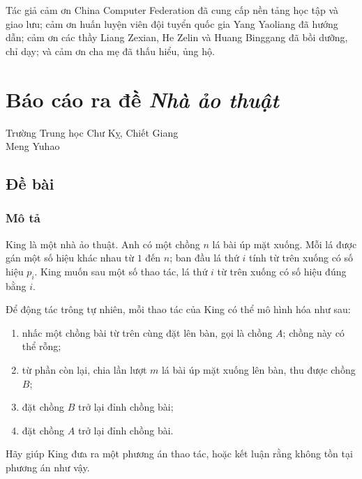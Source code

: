 \documentclass[11pt]{article}
\begin{document}
Tác giả cảm ơn China Computer Federation đã cung cấp nền tảng học tập và giao
lưu; cảm ơn huấn luyện viên đội tuyển quốc gia Yang Yaoliang đã hướng dẫn; cảm
ơn các thầy Liang Zexian, He Zelin và Huang Binggang đã bồi dưỡng, chỉ dạy; và
cảm ơn cha mẹ đã thấu hiểu, ủng hộ.

\section{Báo cáo ra đề \emph{Nhà ảo thuật}}

\begin{center}
Trường Trung học Chư Kỵ, Chiết Giang\\
Meng Yuhao
\end{center}

\renewcommand{\abstractname}{Tóm tắt}
\begin{abstract}
\emph{Nhà ảo thuật} là một bài do tác giả ra cho đợt thi thử nội bộ của đội
tuyển quốc gia Trung Quốc IOI 2023. Bài yêu cầu thí sinh sắp xếp một hoán vị
bằng các thao tác đảo đoạn có độ dài cố định, đồng thời số thao tác càng ít
càng tốt. Đây là một bài xây dựng. Bài viết trình bày điều kiện cần và đủ để có
lời giải, đưa ra vài cách xây dựng và phân tích số thao tác của từng cách. Qua
quá trình ra đề và giải bài, tác giả cũng tổng kết một hướng suy nghĩ thường
gặp cho các bài xây dựng trong thi tin học.
\end{abstract}

\subsection{Đề bài}

\subsubsection{Mô tả}

King là một nhà ảo thuật. Anh có một chồng $n$ lá bài úp mặt xuống. Mỗi lá được
gán một số hiệu khác nhau từ $1$ đến $n$; ban đầu lá thứ $i$ tính từ trên xuống
có số hiệu $p_i$. King muốn sau một số thao tác, lá thứ $i$ từ trên xuống có số
hiệu đúng bằng $i$.

Để động tác trông tự nhiên, mỗi thao tác của King có thể mô hình hóa như sau:
\begin{enumerate}
  \item nhấc một chồng bài từ trên cùng đặt lên bàn, gọi là chồng $A$; chồng này
  có thể rỗng;
  \item từ phần còn lại, chia lần lượt $m$ lá bài úp mặt xuống lên bàn, thu được
  chồng $B$;
  \item đặt chồng $B$ trở lại đỉnh chồng bài;
  \item đặt chồng $A$ trở lại đỉnh chồng bài.
\end{enumerate}
Hãy giúp King đưa ra một phương án thao tác, hoặc kết luận rằng không tồn tại
phương án như vậy.
\end{document}
